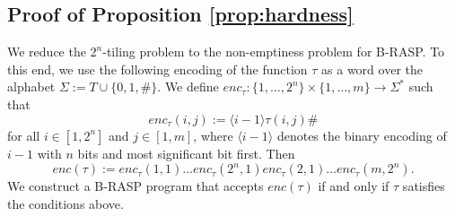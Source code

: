 \subsection{Proof of Proposition \ref{prop:hardness}}
We reduce the $2^n$-tiling problem to the non-emptiness problem for \mbox{B-RASP}.
To this end, we use the following encoding of the function $\tau$ 
as a word over the alphabet $\Sigma := T \cup \{0,1,\#\}$.
We define $\mathit{enc}_\tau \colon \{1,\dots,2^n\} \times \{1,\dots,m\} \to \Sigma^*$ such that
\begin{equation*}\label{eq:enc}
\mathit{enc}_\tau(i,j) := \langle i-1 \rangle \tau(i,j) \#
\end{equation*}
for all $i \in [1,2^n]$ and $j \in [1,m]$, where $\langle i-1 \rangle$ denotes the binary encoding of $i-1$ with $n$ bits
and most significant bit first.
Then 
\[\mathit{enc}(\tau) := \mathit{enc}_\tau(1,1) \dots \mathit{enc}_\tau(2^n,1) \mathit{enc}_\tau(2,1) \dots \mathit{enc}_\tau(m,2^n).\]
We construct a B-RASP program that accepts $\mathit{enc}(\tau)$ if and only if $\tau$ satisfies the conditions above.

